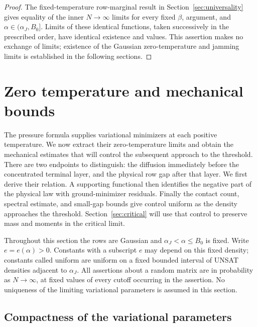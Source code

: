 \documentclass[11pt,a4paper]{article}
\numberwithin{equation}{section}
\theoremstyle{definition}
\theoremstyle{remark}
\begin{document}
\begin{proof}
The fixed-temperature row-marginal result in
Section~\ref{sec:universality} gives equality of the inner
$N\to\infty$ limits for every fixed $\beta$, argument, and
$\alpha\in(\alpha_J,B_0]$.  Limits of these identical functions, taken
successively in the prescribed order, have identical existence and
values.  This assertion makes no exchange of limits; existence of the
Gaussian zero-temperature and jamming limits is established in the
following sections.
\end{proof}


\section{Zero temperature and mechanical bounds}
\label{sec:zero-temperature}

The pressure formula supplies variational minimizers at each positive
temperature.  We now extract their zero-temperature limits and obtain the
mechanical estimates that will control the subsequent approach to the
threshold.  There are two endpoints to distinguish: the diffusion immediately
before the concentrated terminal layer, and the physical row
gap after that layer.  We first derive their relation.  A supporting
functional then identifies the negative part of the physical law with
ground-minimizer residuals.  Finally the contact count, spectral estimate,
and small-gap bounds give control uniform as the density approaches the
threshold.  Section~\ref{sec:critical} will use that control to preserve
mass and moments in the critical limit.

Throughout this section the rows are Gaussian and
\(\alpha_J<\alpha\le B_0\) is fixed.  Write \(e=e(\alpha)>0\).
Constants with a subscript \(e\) may depend on this fixed density;
constants called uniform are uniform on a fixed bounded interval of
UNSAT densities adjacent to \(\alpha_J\).  All assertions about a random
matrix are in probability as \(N\to\infty\), at fixed values of every
cutoff occurring in the assertion.  No uniqueness of the limiting
variational parameters is assumed in this section.

\subsection{Compactness of the variational parameters}
\end{document}
